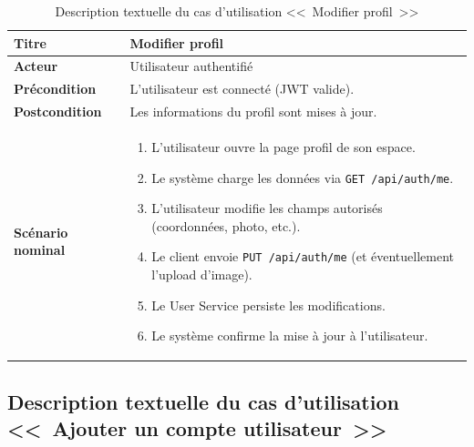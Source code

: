 \begin{table}[htbp]
  \centering
  \small
  \caption{Description textuelle du cas d'utilisation <<~Modifier profil~>>}
  \label{tab:uc-profile}
  \begin{tabular}{|p{3.0cm}|p{10.2cm}|}
    \hline
    \textbf{Titre} & Modifier profil \\
    \hline
    \textbf{Acteur} & Utilisateur authentifié \\
    \hline
    \textbf{Précondition} & L'utilisateur est connecté (JWT valide). \\
    \hline
    \textbf{Postcondition} & Les informations du profil sont mises à jour. \\
    \hline
    \textbf{Scénario nominal}
    &
    \begin{enumerate}[leftmargin=*,itemsep=0.15em,topsep=0.2em]
      \item L'utilisateur ouvre la page profil de son espace.
      \item Le système charge les données via \texttt{GET /api/auth/me}.
      \item L'utilisateur modifie les champs autorisés (coordonnées, photo, etc.).
      \item Le client envoie \texttt{PUT /api/auth/me} (et éventuellement l'upload d'image).
      \item Le User Service persiste les modifications.
      \item Le système confirme la mise à jour à l'utilisateur.
    \end{enumerate}
    \\
    \hline
  \end{tabular}
\end{table}


\subsection{Description textuelle du cas d'utilisation <<~Ajouter un compte utilisateur~>>}

